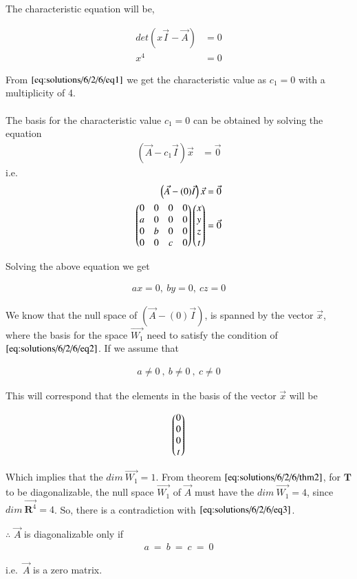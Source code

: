 	The characteristic equation will be,
	
	\begin{align}
	    det\left(x\Vec{I} - \Vec{A}\right) &= 0\\
	    x^{4} &= 0 \label{eq:solutions/6/2/6/eq1}
	\end{align}
	
	From $\eqref{eq:solutions/6/2/6/eq1}$ we get the characteristic value as $c_1 = 0$ with a multiplicity of 4.\\ \\
	The basis for the characteristic value $c_1 = 0$ can be obtained by solving the equation
	\begin{align}
	    \left( \Vec{A} - c_1\Vec{I}\right) \Vec{x} &= \Vec{0}
	\end{align}
	i.e.
	\begin{align}
	    \left( \Vec{A} - (0)\Vec{I}\right) \Vec{x} &= \Vec{0} \\
	    \begin{pmatrix}0&0&0&0 \\ a&0&0&0 \\ 0&b&0&0 \\ 0&0&c&0\end{pmatrix}\begin{pmatrix}x\\y\\z\\t\end{pmatrix} &= \Vec{0} 
	\end{align}
	
	Solving the above equation we get
	
	\begin{align}\label{eq:solutions/6/2/6/eq2}
	    ax = 0,\ by = 0,\ cz = 0 
	\end{align}
	
	We know that the null space of $\left( \Vec{A} - (0)\Vec{I}\right)$, is spanned by the vector $\vec{x}$, where the basis for the space $\Vec{W_1}$ need to satisfy the condition of $\eqref{eq:solutions/6/2/6/eq2}$. If we assume that 
	
	\begin{align}\label{eq:solutions/6/2/6/eq3}
		a \neq 0 \ , \ b \neq 0 \ , \ c \neq 0
	\end{align} 
	
	This will correspond that the elements in the basis of the vector $\vec{x}$ will be 
	
	\begin{align}
		\begin{pmatrix}0\\0\\0\\t\end{pmatrix}
	\end{align}
	
	Which implies that the $dim\ \Vec{W_1} = 1$. From theorem $\ref{eq:solutions/6/2/6/thm2}$, for $\mathbf{T}$ to be diagonalizable, the null space $\Vec{W_1}$ of $\vec{A}$ must have the $dim\ \Vec{W_1} = 4$, since $dim\ \Vec{\mathbf{R}^4} = 4$. So, there is a contradiction with $\eqref{eq:solutions/6/2/6/eq3}$.
	
	$\therefore$ $\Vec{A}$ is diagonalizable only if
	\begin{align}
		a \ = \ b  \ = \ c \ = \ 0
	\end{align}
	
	i.e.\ $\Vec{A}$ is a zero matrix.
		
